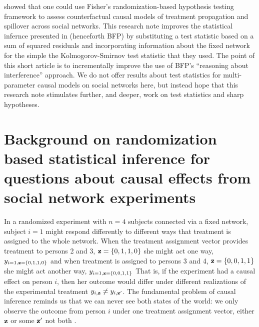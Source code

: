 
\citet{bowers2013sutva} showed that one could use Fisher's randomization-based
hypothesis testing framework to assess counterfactual causal models of
treatment propagation and spillover across social networks.  This research
note improves the statistical infernce presented in \citet{bowers2013sutva}
(henceforth BFP) by substituting a test statistic based on a sum of squared
residuals and incorporating information about the fixed network for the simple
the Kolmogorov-Smirnov test statistic  \citep[\S 5.4]{MylesHollander1999a}
that they used. The point of this short article is to incrementally improve
the use of BFP's ``reasoning about interference'' approach. We do not offer
results about test statistics for multi-parameter causal models on social
networks here, but instead hope that this research note stimulates further,
and deeper, work on test statistics and sharp hypotheses.

\section{Background on randomization based statistical inference for questions
about causal effects from social network experiments}

In a randomized experiment with $n=4$ subjects connected via a fixed network,
subject $i=1$ might respond differently to different ways that treatment is
assigned to the whole network. When the treatment assignment vector provides
treatment to persons 2 and 3, $\mathbf{z}=\{0,1,1,0\}$ she might act one way,
$y_{i=1,\mathbf{z}=\{0,1,1,0\}}$ and when treatment is assigned to persons 3 and 4,
$\mathbf{z}=\{0,0,1,1\}$ she might act another way, $y_{i=1,\mathbf{z}=\{0,0,1,1\}}$ That
is, if the experiment had a causal effect on person $i$, then her outcome
would differ under different realizations of the experimental treatment
$y_{i,\mathbf{z}} \ne y_{i,\mathbf{z}'}$. The fundamental problem of causal inference
reminds us that we can never see both states of the world: we only observe the
outcome from person $i$ under one treatment assignment vector, either $\mathbf{z}$ or
some $\mathbf{z}'$ not both  \cite{holland:1986a}.

